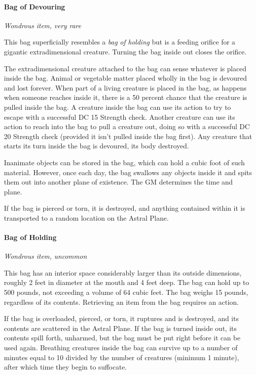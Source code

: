 \documentclass[
]{article}
\begin{document}
\hypertarget{bag-of-devouring}{%
\paragraph{Bag of Devouring}\label{bag-of-devouring}}

\emph{Wondrous item, very rare}

This bag superficially resembles a \emph{bag of holding} but is a
feeding orifice for a gigantic extradimensional creature. Turning the
bag inside out closes the orifice.

The extradimensional creature attached to the bag can sense whatever is
placed inside the bag. Animal or vegetable matter placed wholly in the
bag is devoured and lost forever. When part of a living creature is
placed in the bag, as happens when someone reaches inside it, there is a
50 percent chance that the creature is pulled inside the bag. A creature
inside the bag can use its action to try to escape with a successful DC
15 Strength check. Another creature can use its action to reach into the
bag to pull a creature out, doing so with a successful DC 20 Strength
check (provided it isn't pulled inside the bag first). Any creature that
starts its turn inside the bag is devoured, its body destroyed.

Inanimate objects can be stored in the bag, which can hold a cubic foot
of such material. However, once each day, the bag swallows any objects
inside it and spits them out into another plane of existence. The GM
determines the time and plane.

If the bag is pierced or torn, it is destroyed, and anything contained
within it is transported to a random location on the Astral Plane.

\hypertarget{bag-of-holding}{%
\paragraph{Bag of Holding}\label{bag-of-holding}}

\emph{Wondrous item, uncommon}

This bag has an interior space considerably larger than its outside
dimensions, roughly 2 feet in diameter at the mouth and 4 feet deep. The
bag can hold up to 500 pounds, not exceeding a volume of 64 cubic feet.
The bag weighs 15 pounds, regardless of its contents. Retrieving an item
from the bag requires an action.

If the bag is overloaded, pierced, or torn, it ruptures and is
destroyed, and its contents are scattered in the Astral Plane. If the
bag is turned inside out, its contents spill forth, unharmed, but the
bag must be put right before it can be used again. Breathing creatures
inside the bag can survive up to a number of minutes equal to 10 divided
by the number of creatures (minimum 1 minute), after which time they
begin to suffocate.
\end{document}
